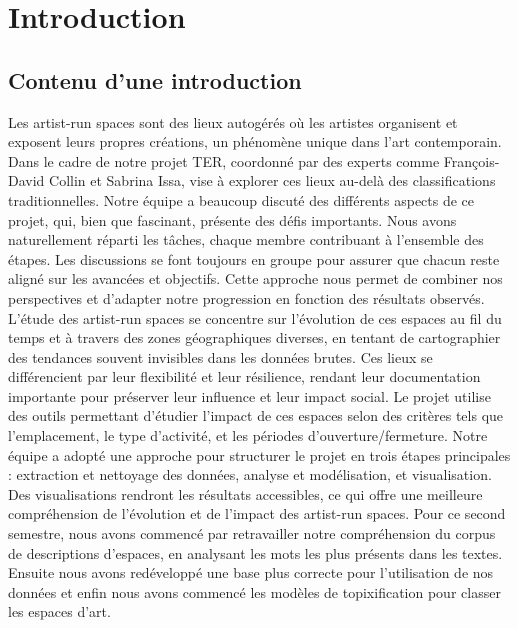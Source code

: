 \documentclass[mstat,12pt]{unswthesis}
\begin{document}



\hypertarget{introduction}{%
\chapter{Introduction}\label{introduction}}

\hypertarget{contenu-dune-introduction}{%
\section{Contenu d'une introduction}\label{contenu-dune-introduction}}

Les artist-run spaces sont des lieux autogérés où les artistes organisent et exposent
leurs propres créations, un phénomène unique dans l’art contemporain. Dans le
cadre de notre projet TER, coordonné par des experts comme François-David
Collin et Sabrina Issa, vise à explorer ces lieux au-delà des classifications traditionnelles. Notre équipe a beaucoup discuté des différents aspects de ce projet, qui,
bien que fascinant, présente des défis importants. Nous avons naturellement réparti
les tâches, chaque membre contribuant à l’ensemble des étapes. Les discussions se
font toujours en groupe pour assurer que chacun reste aligné sur les avancées et
objectifs. Cette approche nous permet de combiner nos perspectives et d’adapter
notre progression en fonction des résultats observés. L’étude des artist-run spaces
se concentre sur l’évolution de ces espaces au fil du temps et à travers des zones
géographiques diverses, en tentant de cartographier des tendances souvent invisibles dans les données brutes. Ces lieux se différencient par leur flexibilité et leur
résilience, rendant leur documentation importante pour préserver leur influence et
leur impact social. Le projet utilise des outils permettant d’étudier l’impact de ces
espaces selon des critères tels que l’emplacement, le type d’activité, et les périodes
d’ouverture/fermeture. Notre équipe a adopté une approche pour structurer le projet en trois étapes principales : extraction et nettoyage des données, analyse et
modélisation, et visualisation. Des visualisations rendront les résultats accessibles,
ce qui offre une meilleure compréhension de l’évolution et de l’impact des artist-run
spaces.
Pour ce second semestre, nous avons commencé par retravailler notre compréhension du corpus de descriptions d'espaces, en analysant les mots les plus présents dans les textes. Ensuite nous avons redéveloppé une base plus correcte pour l'utilisation de nos données et enfin nous avons commencé les modèles de topixification pour classer les espaces d'art.
\end{document}
